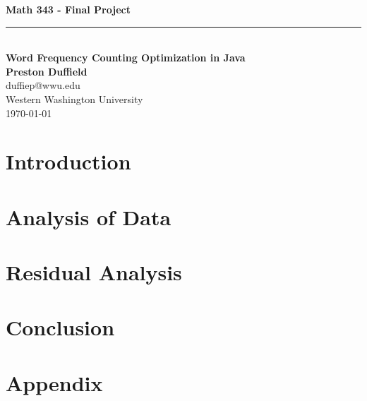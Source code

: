 \documentclass{article}
\begin{document}
\noindent

\begin{center}
    \vspace*{0.3\textheight}
    {\fontsize{80}{18}\textbf{Math 343 - Final Project}}\\
    \vspace{6pt} %
    \rule{0.87\linewidth}{1pt}\\ %
    \vspace{12pt} %
    \LARGE\textbf{Word Frequency Counting Optimization in Java}\\
    
    \vspace{12pt}
    \Large\textbf{Preston Duffield} \\
    \Large duffiep@wwu.edu \\
    \Large Western Washington University \\
    \today
    \vspace{24pt}
\end{center}
\clearpage
\section*{Introduction}
\section*{Analysis of Data}
\section*{Residual Analysis}
\section*{Conclusion}

\clearpage
\appendix
\section*{Appendix}
\end{document}

